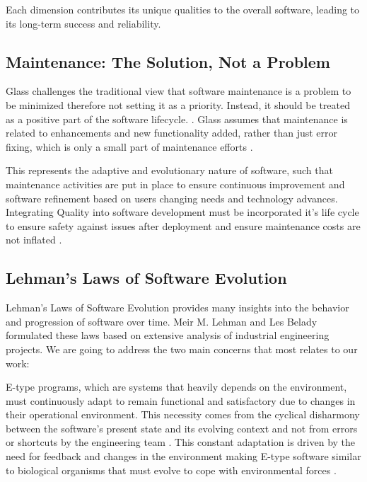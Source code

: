 Each dimension contributes its unique qualities to the overall software, leading to its long-term success and reliability.

\subsection{Maintenance: The Solution, Not a Problem}

Glass challenges the traditional view that software maintenance is a problem to be minimized therefore not setting it as a priority. Instead, it should be treated as a positive part of the software lifecycle. \cite{MaintenanceGlass1998}. Glass assumes that maintenance is related to enhancements and new functionality added, rather than just error fixing, which is only a small part of maintenance efforts \cite{MaintenanceGlass1998}.

This represents the adaptive and evolutionary nature of software, such that maintenance activities are put in place to ensure continuous improvement and software refinement based on users changing needs and technology advances. Integrating Quality into software development must be incorporated it's life cycle to ensure safety against issues after deployment and ensure maintenance costs are not inflated \cite{osterweil1996strategic} \cite{ManagingMaintenance1983}.
    
\subsection{Lehman’s Laws of Software Evolution}

Lehman’s Laws of Software Evolution provides many insights into the behavior and progression of software over time. Meir M. Lehman and Les Belady formulated these laws based on extensive analysis of industrial engineering projects. We are going to address the two main concerns that most relates to our work:

E-type programs, which are systems that heavily depends on the environment, must continuously adapt to remain functional and satisfactory due to changes in their operational environment. This necessity comes from the cyclical disharmony between the software's present state and its evolving context and not from errors or shortcuts by the engineering team \cite{Lehman1996Laws}. This constant adaptation is driven by the need for feedback and changes in the environment making E-type software similar to biological organisms that must evolve to cope with environmental forces \cite{LehmanLaws1980}.

